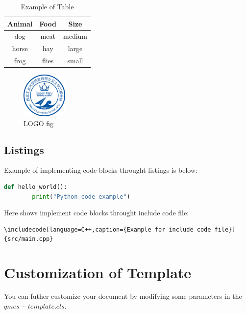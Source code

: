 \documentclass{qmes-template}
\begin{document}

\begin{table}[h!]
    \centering
    \caption{Example of Table} 
    \label{table:1}
    \begin{tabular}{ccc}
        \hline
        Animal & Food  & Size   \\
        \hline
        dog    & meat  & medium \\
        horse  & hay   & large  \\
        frog   & flies & small  \\
        \hline
    \end{tabular}
\end{table}


\begin{figure}[ht]
    \centering
    \includegraphics[width=0.2\textwidth]{./figure/LOGO.jpg}
    \caption{LOGO fig}
\end{figure}

\subsection{Listings}
Example of implementing code blocks throught listings is below:


\begin{lstlisting}[language=Python,caption={Example Code 2}] 
    def hello_world():
        print("Python code example") 
\end{lstlisting}

Here shows implement code blocks throught include code file:
\begin{lstlisting}[caption={The Implementing of Code Block Below}]
\includecode[language=C++,caption={Example for include code file}]{src/main.cpp}
\end{lstlisting}

\newpage{}
\section{Customization of Template}
You can futher customize your document by modifying some parameters in the $qmes-template.cls$.
\end{document}
